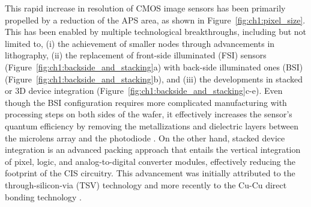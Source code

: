 This rapid increase in resolution of CMOS image sensors has been primarily propelled by a reduction of the APS area, as shown in Figure~\ref{fig:ch1:pixel_size}. This has been enabled by multiple technological breakthroughs, including but not limited to, (i) the achievement of smaller nodes through advancements in lithography, (ii) the replacement of front-side illuminated (FSI) sensors (Figure~\ref{fig:ch1:backside_and_stacking}a) with back-side illuminated ones (BSI) (Figure~\ref{fig:ch1:backside_and_stacking}b), and (iii) the developments in stacked or 3D device integration (Figure~\ref{fig:ch1:backside_and_stacking}c-e). Even though the BSI configuration requires more complicated manufacturing with processing steps on both sides of the wafer, it effectively increases the sensor's quantum efficiency by removing the metallizations and dielectric layers between the microlens array and the photodiode \cite{Vici2020PerformanceConfiguration, Yaung2011HighShrinkage}. On the other hand, stacked device integration is an advanced packing approach that entails the vertical integration of pixel, logic, and analog-to-digital converter modules, effectively reducing the footprint of the CIS circuitry. This advancement was initially attributed to the through-silicon-via (TSV) technology and more recently to the Cu-Cu direct bonding technology \cite{Kagawa20193DSensors}. 

